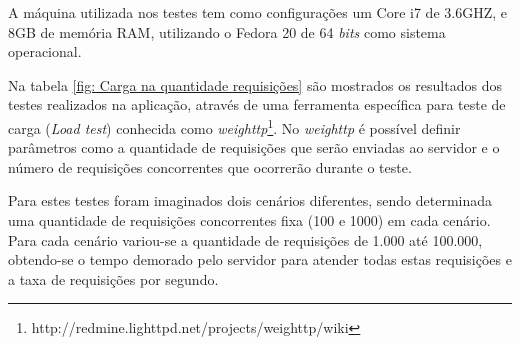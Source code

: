 A máquina utilizada nos testes tem como configurações um Core i7 de 3.6GHZ, e 8GB de memória RAM, utilizando o Fedora 20 de 64 \textit{bits} como sistema operacional.


Na tabela \ref{fig: Carga na quantidade requisições} são mostrados os resultados dos testes realizados na aplicação, através de uma ferramenta específica para teste de carga (\textit{Load test}) conhecida como \textit{weighttp}\footnote{http://redmine.lighttpd.net/projects/weighttp/wiki}. No \textit{weighttp} é possível definir parâmetros como a quantidade de requisições que serão enviadas ao servidor e o número de requisições concorrentes que ocorrerão durante o teste.

Para estes testes foram imaginados dois cenários diferentes, sendo determinada uma quantidade de requisições concorrentes fixa (100 e 1000) em cada cenário. Para cada cenário variou-se a quantidade de requisições de 1.000 até 100.000, obtendo-se o tempo demorado pelo servidor para atender todas estas requisições e a taxa de requisições por segundo. 


